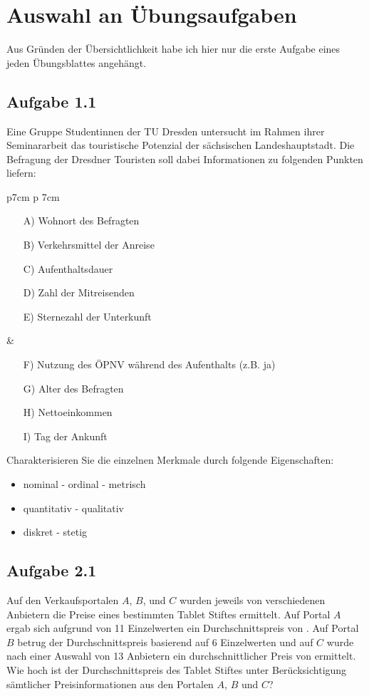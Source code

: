 \documentclass{article}
\begin{document}
	\section*{Auswahl an Übungsaufgaben}
	
	Aus Gründen der Übersichtlichkeit habe ich hier nur die erste Aufgabe eines jeden Übungsblattes angehängt.
	
	\subsection*{Aufgabe 1.1}
	Eine Gruppe Studentinnen der TU Dresden untersucht im Rahmen ihrer Seminararbeit das touristische Potenzial der sächsischen Landeshauptstadt. Die Befragung der Dresdner Touristen soll dabei Informationen zu folgenden Punkten liefern:
	
	\begin{tabular}{p{7cm} p {7cm}}
		\begin{itemize}
			\item[A)] Wohnort des Befragten
			\item[B)] Verkehrsmittel der Anreise
			\item[C)] Aufenthaltsdauer
			\item[D)] Zahl der Mitreisenden
			\item[E)] Sternezahl der Unterkunft
		\end{itemize}
		&
		\begin{itemize}
			\item[F)] Nutzung des ÖPNV während des Aufenthalts (z.B. ja)
			\item[G)] Alter des Befragten
			\item[H)] Nettoeinkommen
			\item[I)] Tag der Ankunft
		\end{itemize}
	\end{tabular}
	
	Charakterisieren Sie die einzelnen Merkmale durch folgende Eigenschaften:
	\begin{itemize}
		\item nominal - ordinal - metrisch
		\item quantitativ - qualitativ
		\item diskret - stetig
	\end{itemize}

	\subsection*{Aufgabe 2.1}
	Auf den Verkaufsportalen $A$, $B$, und $C$ wurden jeweils von verschiedenen Anbietern die Preise eines bestimmten Tablet Stiftes ermittelt. Auf Portal $A$ ergab sich aufgrund von 11 Einzelwerten ein Durchschnittspreis von . Auf Portal $B$ betrug der Durchschnittspreis basierend auf 6 Einzelwerten  und auf $C$ wurde nach einer Auswahl von 13 Anbietern ein durchschnittlicher Preis von  ermittelt. Wie hoch ist der Durchschnittspreis des Tablet Stiftes unter Berücksichtigung sämtlicher Preisinformationen aus den Portalen $A$, $B$ und $C$?
	
\end{document}
